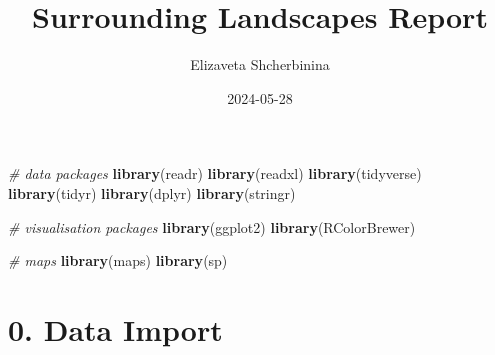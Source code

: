 \documentclass[
]{article}
\title{Surrounding Landscapes Report}
\author{Elizaveta Shcherbinina}
\date{2024-05-28}
\newenvironment{Shaded}{\begin{snugshade}}{\end{snugshade}}
\newcommand{\CommentTok}[1]{\textcolor[rgb]{0.56,0.35,0.01}{\textit{#1}}}
\newcommand{\FunctionTok}[1]{\textcolor[rgb]{0.13,0.29,0.53}{\textbf{#1}}}
\newcommand{\NormalTok}[1]{#1}
\begin{document}
\maketitle

\begin{Shaded}
\begin{Highlighting}[]
\CommentTok{\# data packages}
\FunctionTok{library}\NormalTok{(readr)}
\FunctionTok{library}\NormalTok{(readxl)}
\FunctionTok{library}\NormalTok{(tidyverse)}
\FunctionTok{library}\NormalTok{(tidyr)}
\FunctionTok{library}\NormalTok{(dplyr)}
\FunctionTok{library}\NormalTok{(stringr)}

\CommentTok{\# visualisation packages}
\FunctionTok{library}\NormalTok{(ggplot2)}
\FunctionTok{library}\NormalTok{(RColorBrewer)}

\CommentTok{\# maps }
\FunctionTok{library}\NormalTok{(maps)}
\FunctionTok{library}\NormalTok{(sp)}
\end{Highlighting}
\end{Shaded}

\section{0. Data Import}\label{data-import}
\end{document}
